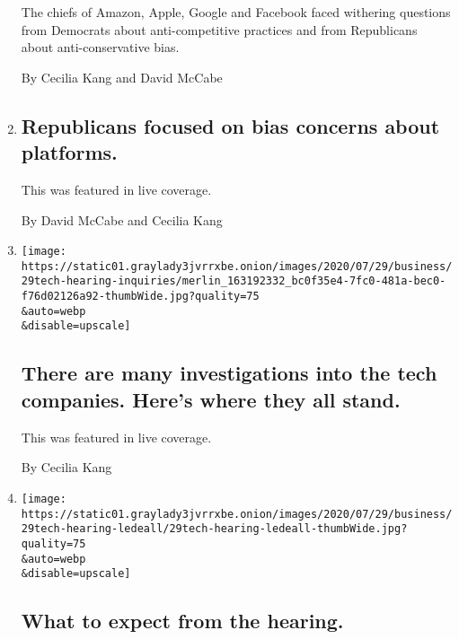 \begin{enumerate}
  The chiefs of Amazon, Apple, Google and Facebook faced withering
  questions from Democrats about anti-competitive practices and from
  Republicans about anti-conservative bias.

  By Cecilia Kang and David McCabe
\item
  \href{/live/2020/07/29/technology/tech-ceos-hearing-testimony/republicans-focused-on-bias-concerns-about-platforms}{}

  \hypertarget{republicans-focused-on-bias-concerns-about-platforms}{%
  \subsection{Republicans focused on bias concerns about
  platforms.}\label{republicans-focused-on-bias-concerns-about-platforms}}

  This was featured in live coverage.

  By David McCabe and Cecilia Kang
\item
  \href{/live/2020/07/29/technology/tech-ceos-hearing-testimony/there-are-many-investigations-into-the-tech-companies-heres-where-they-all-stand}{}

  \texttt{[image: https://static01.graylady3jvrrxbe.onion/images/2020/07/29/business/29tech-hearing-inquiries/merlin\_163192332\_bc0f35e4-7fc0-481a-bec0-f76d02126a92-thumbWide.jpg?quality=75\\\&auto=webp\\\&disable=upscale]}

  \hypertarget{there-are-many-investigations-into-the-tech-companies-heres-where-they-all-stand}{%
  \subsection{There are many investigations into the tech companies.
  Here's where they all
  stand.}\label{there-are-many-investigations-into-the-tech-companies-heres-where-they-all-stand}}

  This was featured in live coverage.

  By Cecilia Kang
\item
  \href{/live/2020/07/29/technology/tech-ceos-hearing-testimony/what-to-expect-from-the-hearing}{}

  \texttt{[image: https://static01.graylady3jvrrxbe.onion/images/2020/07/29/business/29tech-hearing-ledeall/29tech-hearing-ledeall-thumbWide.jpg?quality=75\\\&auto=webp\\\&disable=upscale]}

  \hypertarget{what-to-expect-from-the-hearing}{%
  \subsection{What to expect from the
  hearing.}\label{what-to-expect-from-the-hearing}}


\end{enumerate}
